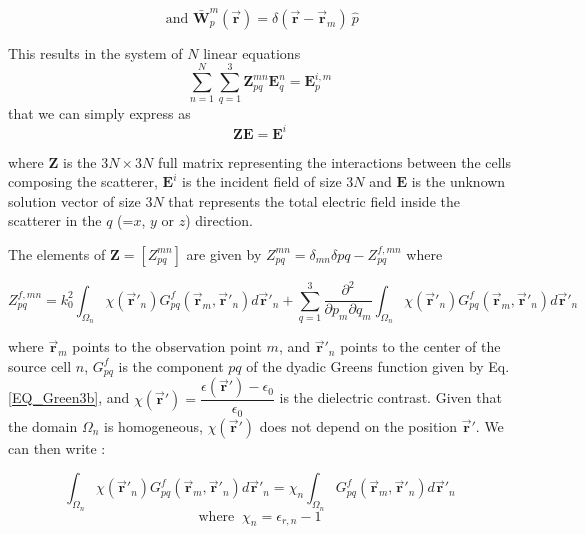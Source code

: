 \documentclass{article}
\begin{document}
 
\begin{equation}
\label{EQ_MoM2-c}
\text{ and } \bar{\textbf{W}}_p^m(\vec{\textbf{r}}) = \delta(\vec{\textbf{r}}-\vec{\textbf{r}}_m) \: \hat{p} 
\nonumber
\end{equation} 

This results in the system of $N$ linear equations    
\begin{equation}
\label{EQ_MoM3-a}
\sum_{n=1}^{N}\sum_{q=1}^3 \textbf{Z}_{pq}^{mn} \textbf{E}_q^n = \textbf{E}_p^{i,m}
\end{equation} 
that we can simply express as   
\begin{equation}
\label{EQ_MoM3-b}
\textbf{Z} \textbf{E} = \textbf{E}^i
\end{equation} 

where \textbf{Z} is the $3N \times 3N$ full matrix representing the interactions between the cells composing the scatterer, $\textbf{E}^i$ is the incident field of size $3N$ and $\textbf{E}$ is the unknown solution vector of size $3N$ that represents the total electric field inside the scatterer in the $q$ (=$x$, $y$ or $z$) direction.

The elements of $\textbf{Z} = \left[ Z_{pq}^{mn} \right]$ are given by $Z_{pq}^{mn} = \delta_{mn} \delta{pq} - Z_{pq}^{f, mn}$ where 

\begin{equation}
\label{EQ_MoM4}
Z_{pq}^{f, mn} = k_0^2 \int_{\Omega_n} \chi(\vec{\textbf{r}}'_n) G_{pq}^f(\vec{\textbf{r}}_m,\vec{\textbf{r}}'_n) d\vec{\textbf{r}}'_n + \sum_{q=1}^{3} \dfrac{\partial^2}{\partial p_m \partial q_m} \int_{\Omega_n} \chi(\vec{\textbf{r}}'_n) G_{pq}^f(\vec{\textbf{r}}_m,\vec{\textbf{r}}'_n) d\vec{\textbf{r}}'_n
\end{equation} 

where $\vec{\textbf{r}}_m$ points to the observation point $m$, and $\vec{\textbf{r}}'_n$ points to the center of the source cell $n$, $G_{pq}^f$ is the component $pq$ of the dyadic Greens function given by Eq. \ref{EQ_Green3b}, and $\chi(\vec{\textbf{r}}') = \dfrac{\epsilon(\vec{\textbf{r}}')-\epsilon_0}{\epsilon_0}$ is the dielectric contrast. Given that the domain $\Omega_n$ is homogeneous, $\chi(\vec{\textbf{r}}')$ does not depend on the position $\vec{\textbf{r}}'$. We can then write :

\begin{equation}
\label{EQ_MoM_Chi1}
\int_{\Omega_n} \chi(\vec{\textbf{r}}'_n) G_{pq}^f(\vec{\textbf{r}}_m,\vec{\textbf{r}}'_n) d\vec{\textbf{r}}'_n = \chi_n \int_{\Omega_n} G_{pq}^f(\vec{\textbf{r}}_m,\vec{\textbf{r}}'_n) d\vec{\textbf{r}}'_n
\end{equation} 
\begin{equation}
\label{EQ_MoM_Chi2}
\text{where} \; \;  \chi_n = \epsilon_{r,n} - 1 \nonumber
\end{equation}    
\end{document}
